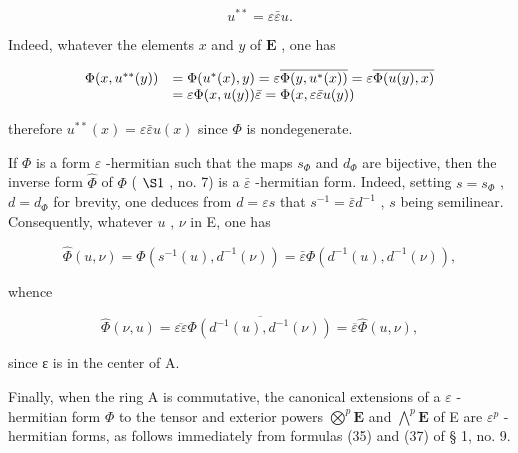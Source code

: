 \[
u ^ {* *} = \varepsilon \bar {\varepsilon} u.\tag{1}
\]

Indeed, whatever the elements \(x\) and \(y\) of \(\mathbf{E}\) , one has

\[
\begin{array}{r l} \Phi (x, u ^ {* *} (y)) & = \Phi (u ^ {*} (x), y) = \varepsilon \overline {{\Phi (y , u ^ {*} (x))}} = \varepsilon \overline {{\Phi (u (y) , x)}} \\ & = \varepsilon \Phi (x, u (y)) \bar {\varepsilon} = \Phi (x, \varepsilon \bar {\varepsilon} u (y)) \end{array}
\]

therefore \(u^{**}(x) = \varepsilon \bar{\varepsilon} u(x)\) since \(\Phi\) is nondegenerate.

If \(\Phi\) is a form \(\varepsilon\) -hermitian such that the maps \(s_{\Phi}\) and \(d_{\Phi}\) are bijective, then the inverse form \(\hat{\Phi}\) of \(\Phi\) ( \(\S 1\) , no. 7) is a \(\bar{\varepsilon}\) -hermitian form. Indeed, setting \(s = s_{\Phi}\) , \(d = d_{\Phi}\) for brevity, one deduces from \(d = \varepsilon s\) that \(s^{-1} = \bar{\varepsilon} d^{-1}\) , \(s\) being semilinear. Consequently, whatever \(u\) , \(\nu\) in E, one has

\[
\hat {\Phi} (u, \nu) = \Phi (s ^ {- 1} (u), d ^ {- 1} (\nu)) = \bar {\varepsilon} \Phi (d ^ {- 1} (u), d ^ {- 1} (\nu)),
\]

whence

\[
\widehat {\Phi} (\nu , u) = \overline {{\varepsilon \varepsilon}} \overline {{\Phi (d ^ {- 1} (u) , d ^ {- 1} (\nu))}} = \overline {{\varepsilon}} \widehat {\Phi} (u, \nu),
\]

since ε is in the center of A.

Finally, when the ring A is commutative, the canonical extensions of a \(\varepsilon\) -hermitian form \(\Phi\) to the tensor and exterior powers \(\bigotimes^{p}\mathbf{E}\) and \(\bigwedge^{p}\mathbf{E}\) of E are \(\varepsilon^{p}\) -hermitian forms, as follows immediately from formulas (35) and (37) of § 1, no. 9.

